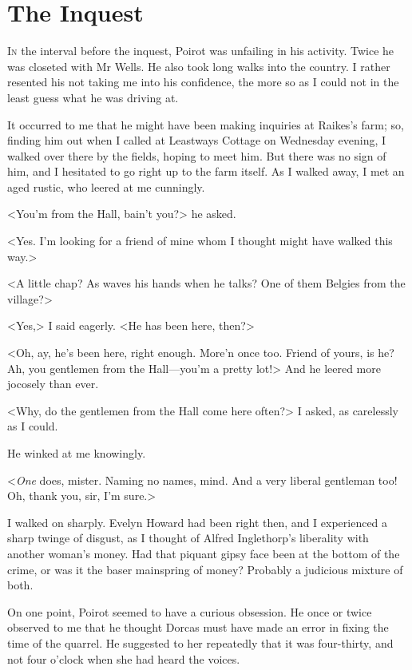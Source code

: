 \chapter{The Inquest} 

\lettrine{I}{n} the interval before the inquest, Poirot was unfailing in his activity. Twice he was closeted with Mr Wells. He also took long walks into the country. I rather resented his not taking me into his confidence, the more so as I could not in the least guess what he was driving at. 

 It occurred to me that he might have been making inquiries at Raikes's farm; so, finding him out when I called at Leastways Cottage on Wednesday evening, I walked over there by the fields, hoping to meet him. But there was no sign of him, and I hesitated to go right up to the farm itself. As I walked away, I met an aged rustic, who leered at me cunningly. 

 <You'm from the Hall, bain't you?> he asked. 

 <Yes. I'm looking for a friend of mine whom I thought might have walked this way.> 

 <A little chap? As waves his hands when he talks? One of them Belgies from the village?> 

 <Yes,> I said eagerly. <He has been here, then?> 

 <Oh, ay, he's been here, right enough. More'n once too. Friend of yours, is he? Ah, you gentlemen from the Hall—you'm a pretty lot!> And he leered more jocosely than ever. 

 <Why, do the gentlemen from the Hall come here often?> I asked, as carelessly as I could. 

 He winked at me knowingly. 

 <\emph{One} does, mister. Naming no names, mind. And a very liberal gentleman too! Oh, thank you, sir, I'm sure.> 

 I walked on sharply. Evelyn Howard had been right then, and I experienced a sharp twinge of disgust, as I thought of Alfred Inglethorp's liberality with another woman's money. Had that piquant gipsy face been at the bottom of the crime, or was it the baser mainspring of money? Probably a judicious mixture of both. 

 On one point, Poirot seemed to have a curious obsession. He once or twice observed to me that he thought Dorcas must have made an error in fixing the time of the quarrel. He suggested to her repeatedly that it was four-thirty, and not four o'clock when she had heard the voices. 


